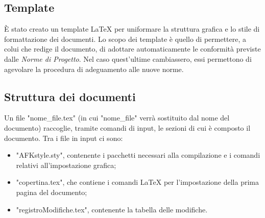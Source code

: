 \subsection{Template}
È stato creato un template \LaTeX{} per uniformare la struttura grafica e lo stile di formattazione dei documenti. Lo scopo dei template è quello di permettere, a colui che redige il documento, di adottare automaticamente le conformità previste dalle \textit{Norme di Progetto}. Nel caso quest'ultime cambiassero, essi permettono di agevolare la procedura di adeguamento alle nuove norme.

\subsection{Struttura dei documenti}
Un file "nome\_file.tex" (in cui "nome\_file" verrà sostituito dal nome del documento) raccoglie, tramite comandi di input, le sezioni di cui è composto il documento. Tra i file in input ci sono:
\begin{itemize}
\item "AFKstyle.sty", contenente i pacchetti necessari alla compilazione e i comandi relativi all'impostazione grafica;
\item "copertina.tex", che contiene i comandi \LaTeX{} per l'impostazione della prima pagina del documento;
\item "registroModifiche.tex", contenente la tabella delle modifiche.
\end{itemize}

